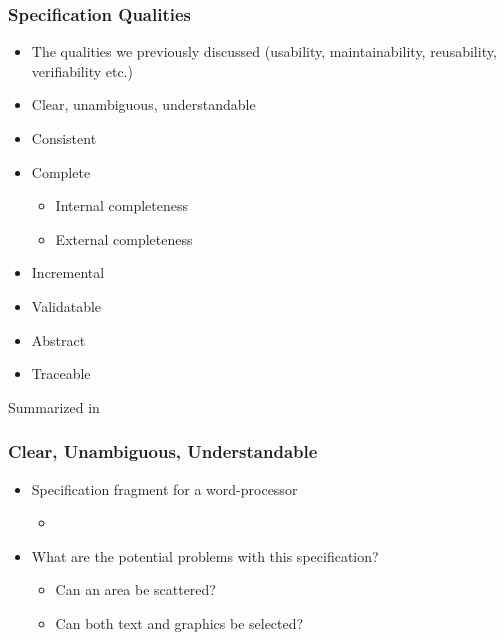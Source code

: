 \documentclass[t,12pt,numbers,fleqn]{beamer}
\begin{document}

\begin{frame}
\frametitle{Specification Qualities}

\begin{itemize}
\item The qualities we previously discussed (usability, maintainability,
  reusability, verifiability etc.)
\item Clear, unambiguous,  understandable
\item Consistent
\item Complete
\begin{itemize}
\item Internal completeness
\item External completeness
\end{itemize}
\item Incremental
\item Validatable
\item Abstract
\item Traceable
\end{itemize}

Summarized in \cite[p.\ 406]{SmithAndKoothoor2016}

\end{frame}


\begin{frame}
\frametitle{Clear, Unambiguous, Understandable}

\begin{itemize}

\item Specification fragment for a word-processor
\begin{itemize}
\item {}
\end{itemize}
\item What are the potential problems with this specification?
\begin{itemize}
\item<2-> {\alert{Can an area be scattered?}}
\item<2->{\alert{Can both text and graphics be selected?}}
\end{itemize}
\end{itemize}

\end{frame}
\end{document}
